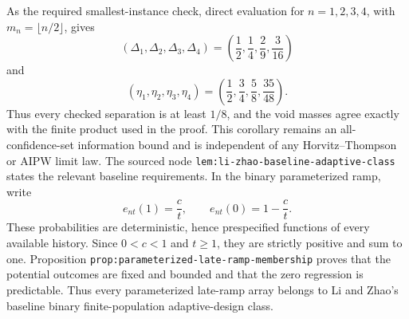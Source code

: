 As the required smallest-instance check, direct evaluation for \(n=1,2,3,4\), with \(m_n=\lfloor n/2\rfloor\), gives
\[
 (\Delta_1,\Delta_2,\Delta_3,\Delta_4)
 =\left(\frac12,\frac14,\frac29,\frac3{16}\right)
\]
and
\[
 (\eta_1,\eta_2,\eta_3,\eta_4)
 =\left(\frac12,\frac34,\frac58,\frac{35}{48}\right).
\]
Thus every checked separation is at least \(1/8\), and the void masses agree exactly with the finite product used in the proof. This corollary remains an all-confidence-set information bound and is independent of any Horvitz--Thompson or AIPW limit law.
The sourced node \texttt{lem:li-zhao-baseline-adaptive-class} states the relevant baseline requirements. In the binary parameterized ramp, write
\[
 e_{nt}(1)=\frac ct,
 \qquad
 e_{nt}(0)=1-\frac ct.
\]
These probabilities are deterministic, hence prespecified functions of every available history. Since \(0<c<1\) and \(t\ge1\), they are strictly positive and sum to one. Proposition \texttt{prop:parameterized-late-ramp-membership} proves that the potential outcomes are fixed and bounded and that the zero regression is predictable. Thus every parameterized late-ramp array belongs to Li and Zhao's baseline binary finite-population adaptive-design class.

